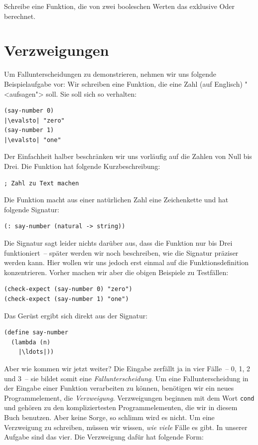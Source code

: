 \begin{aufgabeinline}
  Schreibe eine Funktion, die von zwei booleschen Werten das exklusive
  Oder berechnet. 
\end{aufgabeinline}

\section{Verzweigungen}

%
Um Fallunterscheidungen zu demonstrieren, nehmen wir uns folgende
Beispielaufgabe vor: Wir schreiben eine Funktion, die eine Zahl (auf
Englisch) "<aufsagen"> soll.  Sie soll sich so verhalten:
%
\begin{lstlisting}
(say-number 0)
|\evalsto| "zero"
(say-number 1)
|\evalsto| "one"
\end{lstlisting}
%
Der Einfachheit halber beschränken wir uns vorläufig auf die Zahlen
von Null bis Drei.  Die Funktion hat folgende Kurzbeschreibung:
%
\begin{lstlisting}
; Zahl zu Text machen
\end{lstlisting}
%
Die Funktion macht aus einer natürlichen Zahl eine Zeichenkette und
hat folgende Signatur:
%
\begin{lstlisting}
(: say-number (natural -> string))
\end{lstlisting}
%
Die Signatur sagt leider nichts darüber aus, dass die Funktion nur bis
Drei funktioniert~-- später werden wir noch beschreiben, wie die
Signatur präziser werden kann.  Hier wollen wir uns jedoch erst
einmal auf die Funktionsdefinition konzentrieren.  Vorher machen wir
aber die obigen Beispiele zu Testfällen:
%
\begin{lstlisting}
(check-expect (say-number 0) "zero")
(check-expect (say-number 1) "one")
\end{lstlisting}
%
Das Gerüst ergibt sich direkt aus der Signatur:
%
\begin{lstlisting}
(define say-number
  (lambda (n)
    |\ldots|))
\end{lstlisting}
%
Aber wie kommen wir jetzt weiter?  Die Eingabe zerfällt ja in vier
Fälle~-- 0, 1, 2 und 3~-- sie bildet somit eine
\textit{Fallunterscheidung}.  Um eine
Fallunterscheidung in der Eingabe einer Funktion verarbeiten zu können,
benötigen wir ein neues Programmelement, die
\textit{Verzweigung}.  Verzweigungen beginnen mit
dem Wort \lstinline{cond} und gehören zu den kompliziertesten
Programmelementen, die wir in diesem Buch benutzen.  Aber keine Sorge,
so schlimm wird es nicht.  Um eine Verzweigung zu schreiben, müssen
wir wissen, \emph{wie viele} Fälle es gibt.  In unserer Aufgabe sind das
vier.  Die Verzweigung dafür hat folgende Form:
%

